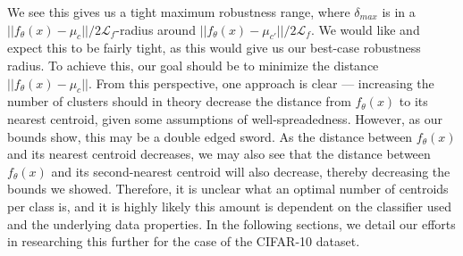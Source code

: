 We see this gives us a tight maximum robustness range, where $\delta_{max}$ is in a $||f_\theta(x)-\mu_c||/2\mathcal{L}_f$-radius around $||f_\theta(x) - \mu_{c'}||/2\mathcal{L}_f$. We would like and expect this to be fairly tight, as this would give us our best-case robustness radius. To achieve this, our goal should be to minimize the distance $||f_\theta(x)- \mu_c||$. From this perspective, one approach is clear — increasing the number of clusters should in theory decrease the distance from $f_\theta(x)$ to its nearest centroid, given some assumptions of well-spreadedness. However, as our bounds show, this may be a double edged sword. As the distance between $f_\theta(x)$ and its nearest centroid decreases, we may also see that the distance between $f_\theta(x)$ and its second-nearest centroid will also decrease, thereby decreasing the bounds we showed. Therefore, it is unclear what an optimal number of centroids per class is, and it is highly likely this amount is dependent on the classifier used and the underlying data properties. In the following sections, we detail our efforts in researching this further for the case of the CIFAR-10 dataset.